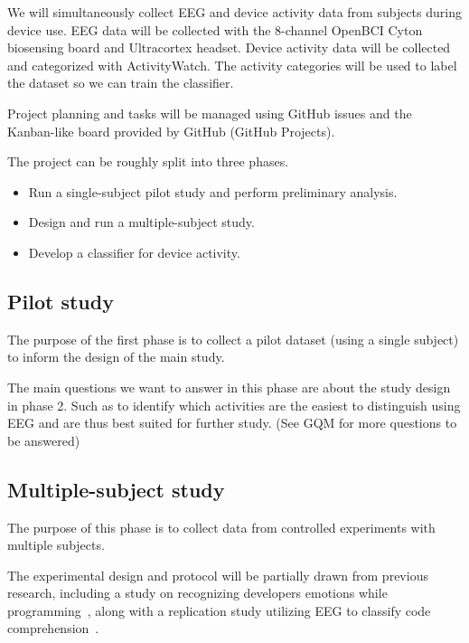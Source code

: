 \documentclass{IEEEtran}
\begin{document}
\begin{refsection}

We will simultaneously collect EEG and device activity data from subjects during device use. EEG data will be collected with the 8-channel OpenBCI Cyton biosensing board and Ultracortex headset. Device activity data will be collected and categorized with ActivityWatch. The activity categories will be used to label the dataset so we can train the classifier.

Project planning and tasks will be managed using GitHub issues and the Kanban-like board provided by GitHub (GitHub Projects).

The project can be roughly split into three phases.

\begin{itemize}
 \item Run a single-subject pilot study and perform preliminary analysis.
 \item Design and run a multiple-subject study.
 \item Develop a classifier for device activity.
\end{itemize}

\subsection{Pilot study}

The purpose of the first phase is to collect a pilot dataset (using a single subject) to inform the design of the main study.

The main questions we want to answer in this phase are about the study design in phase 2. Such as to identify which activities are the easiest to distinguish using EEG and are thus best suited for further study. (See GQM for more questions to be answered)

\subsection{Multiple-subject study}


The purpose of this phase is to collect data from controlled experiments with multiple subjects.

The experimental design and protocol will be partially drawn from previous research, including a study on recognizing developers emotions while programming~\cite{girardi_recognizing_2020}, along with a replication study utilizing EEG to classify code comprehension~\cite{fucci_replication_2019}.


\end{refsection}
\end{document}
